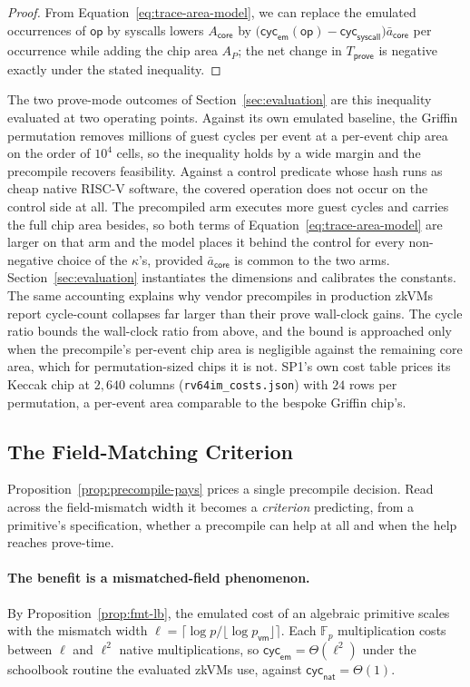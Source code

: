 \begin{proof}
From Equation~\eqref{eq:trace-area-model}, we can replace the emulated occurrences of $\mathsf{op}$ by syscalls lowers $A_{\mathsf{core}}$ by $\bigl(\mathsf{cyc}_{\mathsf{em}}(\mathsf{op}) - \mathsf{cyc}_{\mathsf{syscall}}\bigr)\bar a_{\mathsf{core}}$ per occurrence while adding the chip area $A_P$; the net change in $T_{\mathsf{prove}}$ is negative exactly under the stated inequality.
\end{proof} The two prove-mode outcomes of Section~\ref{sec:evaluation} are this inequality evaluated at two operating points. Against its own emulated baseline, the Griffin permutation removes millions of guest cycles per event at a per-event chip area on the order of $10^{4}$ cells, so the inequality holds by a wide margin and the precompile recovers feasibility. Against a control predicate whose hash runs as cheap native RISC-V software, the covered operation does not occur on the control side at all. The precompiled arm executes more guest cycles and carries the full chip area besides, so both terms of Equation~\eqref{eq:trace-area-model} are larger on that arm and the model places it behind the control for every non-negative choice of the $\kappa$'s, provided $\bar a_{\mathsf{core}}$ is common to the two arms. Section~\ref{sec:evaluation} instantiates the dimensions and calibrates the constants. The same accounting explains why vendor precompiles in production zkVMs report cycle-count collapses far larger than their prove wall-clock gains. The cycle ratio bounds the wall-clock ratio from above, and the bound is approached only when the precompile's per-event chip area is negligible against the remaining core area, which for permutation-sized chips it is not. SP1's own cost table prices its Keccak chip at $2{,}640$ columns (\texttt{rv64im\_costs.json}) with $24$ rows per permutation, a per-event area comparable to the bespoke Griffin chip's.

\subsection{The Field-Matching Criterion}\label{ssec:criterion}
Proposition~\ref{prop:precompile-pays} prices a single precompile decision. Read across the field-mismatch width it becomes a \emph{criterion} predicting, from a primitive's specification, whether a precompile can help at all and when the help reaches prove-time.

\paragraph{The benefit is a mismatched-field phenomenon.} By Proposition~\ref{prop:fmt-lb}, the emulated cost of an algebraic primitive scales with the mismatch width $\ell=\lceil\log p/\lfloor\log p_{\mathsf{vm}}\rfloor\rceil$. Each $\mathbb{F}_p$ multiplication costs between $\ell$ and $\ell^2$ native multiplications, so $\mathsf{cyc}_{\mathsf{em}}=\Theta(\ell^2)$ under the schoolbook routine the evaluated zkVMs use, against $\mathsf{cyc}_{\mathsf{nat}}=\Theta(1)$.

